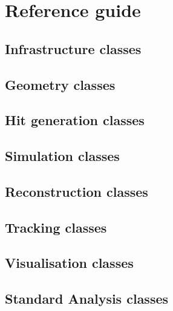 \chapter{Reference guide}

\section{Infrastructure classes}

\section{Geometry classes}

\section{Hit generation classes}

\section{Simulation classes}

\section{Reconstruction classes}

\section{Tracking classes}

\section{Visualisation classes}

\section{Standard Analysis classes}

